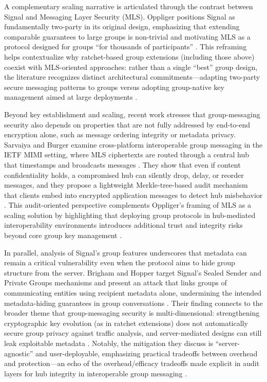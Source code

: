 A complementary scaling narrative is articulated through the contrast between Signal and Messaging Layer Security (MLS). Oppliger positions Signal as fundamentally two-party in its original design, emphasizing that extending comparable guarantees to large groups is non-trivial and motivating MLS as a protocol designed for groups “for thousands of participants” \cite{oppliger2024}. This reframing helps contextualize why ratchet-based group extensions (including those above) coexist with MLS-oriented approaches: rather than a single “best” group design, the literature recognizes distinct architectural commitments—adapting two-party secure messaging patterns to groups versus adopting group-native key management aimed at large deployments \cite{oppliger2024,ayed2025,bobrysheva2021}.

Beyond key establishment and scaling, recent work stresses that group-messaging security also depends on properties that are not fully addressed by end-to-end encryption alone, such as message ordering integrity or metadata privacy. Sarvaiya and Burger examine cross-platform interoperable group messaging in the IETF MIMI setting, where MLS ciphertexts are routed through a central hub that timestamps and broadcasts messages \cite{sarvaiya2025}. They show that even if content confidentiality holds, a compromised hub can silently drop, delay, or reorder messages, and they propose a lightweight Merkle-tree-based audit mechanism that clients embed into encrypted application messages to detect hub misbehavior \cite{sarvaiya2025}. This audit-oriented perspective complements Oppliger’s framing of MLS as a scaling solution by highlighting that deploying group protocols in hub-mediated interoperability environments introduces additional trust and integrity risks beyond core group key management \cite{oppliger2024,sarvaiya2025}.

In parallel, analysis of Signal’s group features underscores that metadata can remain a critical vulnerability even when the protocol aims to hide group structure from the server. Brigham and Hopper target Signal’s Sealed Sender and Private Groups mechanisms and present an attack that links groups of communicating entities using recipient metadata alone, undermining the intended metadata-hiding guarantees in group conversations \cite{brigham2025}. Their finding connects to the broader theme that group-messaging security is multi-dimensional: strengthening cryptographic key evolution (as in ratchet extensions) does not automatically secure group privacy against traffic analysis, and server-mediated designs can still leak exploitable metadata \cite{brigham2025,oppliger2024}. Notably, the mitigation they discuss is “server-agnostic” and user-deployable, emphasizing practical tradeoffs between overhead and protection—an echo of the overhead/efficacy tradeoffs made explicit in audit layers for hub integrity in interoperable group messaging \cite{brigham2025,sarvaiya2025}.

